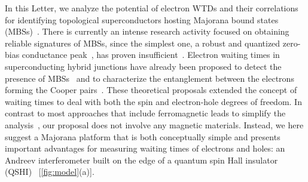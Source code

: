 \documentclass[aps,prl,amsmath,twocolumn,floatfix,superscriptaddress,longbibliography,footinbib]{revtex4-1}
\newcommand{\clr}[1]{\textcolor{blue}{#1}}
\begin{document}
In this Letter, we analyze the potential of electron WTDs and their correlations for identifying topological superconductors hosting Majorana bound states (MBSs)~\cite{Kane2005,Fu2008,Fu2009,Qi2011}. 
There is currently an intense research activity focused on obtaining reliable signatures of MBSs, since the simplest one, a robust and quantized zero-bias conductance peak~\cite{Mourik2012,Higginbotham2015,Deng2016}, has proven insufficient~\cite{Frolov2019,Frolov2021}. 
Electron waiting times in superconducting hybrid junctions have already been proposed to detect the presence of MBSs~\cite{Chevallier2016,Mi2018,Weymann2020,Fu2022,Schulz2022} and to characterize the entanglement between the electrons forming the Cooper pairs~\cite{Rajabi2013,Albert2016,Walldorf2018}. 
These theoretical proposals extended the concept of waiting times to deal with both the spin and electron-hole degrees of freedom. 
In contrast to most approaches that include ferromagnetic leads to simplify the analysis~\cite{Chevallier2016,Weymann2020,Schulz2022}, our proposal does not involve any magnetic materials. 
%
%
Instead, we here suggest a Majorana platform that is both conceptually simple and presents important advantages for measuring waiting times of electrons and holes: 
an Andreev interferometer built on the edge of a quantum spin Hall insulator (QSHI)~\cite{Konig2007,Brune2010,Sullivan2011,Brune2012,Reis2017,Kammhuber2017,Wu2018} [\cref{fig:model}(a)]. 
\end{document}
